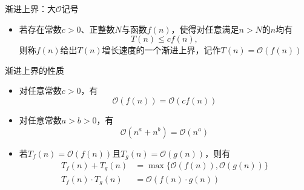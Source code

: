 \begin{frame}{\insertsubsectionhead}
    \begin{block}{渐进上界：大$\mathcal{O}$记号}
        \begin{itemize}
            \item 若存在常数$c>0$、正整数$N$与函数$f(n)$，使得对任意满足$n>N$的$n$均有
                  \[
                      T(n) \leq cf(n),
                  \]
                  则称$f(n)$给出$T(n)$增长速度的一个\alert{渐进上界}，记作$T(n)=\mathcal{O}(f(n))$
        \end{itemize}
    \end{block}
\end{frame}

\begin{frame}{\insertsubsectionhead}
    \begin{exampleblock}{渐进上界的性质}
        \begin{itemize}
            \item 对任意常数$c>0$，有
                  \[
                      \mathcal{O}(f(n))=\mathcal{O}(cf(n))
                  \]
            \item 对任意常数$a>b>0$，有
                  \[
                      \mathcal{O}(n^{a}+n^{b})=\mathcal{O}(n^{a})
                  \]
            \item 若$T_{f}(n)=\mathcal{O}(f(n))$且$T_{g}(n)=\mathcal{O}(g(n))$，则有
                  \begin{align*}
                      T_{f}(n)+T_{g}(n)       & =\max\{\mathcal{O}(f(n)),\mathcal{O}(g(n))\} \\
                      T_{f}(n)\cdot{}T_{g}(n) & =\mathcal{O}(f(n)\cdot{}g(n))
                  \end{align*}
        \end{itemize}
    \end{exampleblock}
\end{frame}

